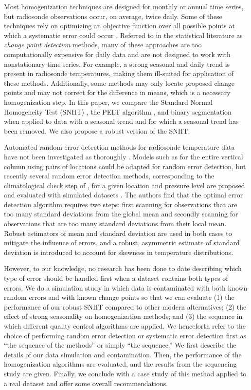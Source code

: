 \documentclass[12pt]{article}
\begin{document}
\begin{doublespacing}
Most homogenization techniques are designed for monthly or annual time series, but radiosonde observations occur, on average, twice daily.  Some of these techniques rely on optimizing an objective function over all possible points at which a systematic error could occur  \cite{killick12, li14, lu10, scott74}.  Referred to in the statistical literature as \emph{change point detection} methods,   many of these approaches are too computationally expensive for daily data and are not designed to work with nonstationary time series.  For example, a strong seasonal and daily trend is present in radiosonde temperatures, making them ill-suited for application of these methods.  Additionally, some methods may only locate proposed change points and may not correct for the difference in means, which is a necessary homogenization step.  In this paper, we compare the Standard Normal Homogeneity Test (SNHT) \cite{alexandersson86}, the PELT algorithm \cite{killick12}, and binary segmentation \cite{scott74} when applied to data with a seasonal trend and for which a seasonal trend has been removed.  We also propose a robust version of the SNHT.

Automated random error detection methods for radiosonde temperature data have not been investigated as thoroughly \cite{durre06,durre08,lanzante96}.  Models such as \cite{ignaccolo14} for  the entire vertical column using pairs of locations could be adapted for random error detection, but  recently  several random error detection methods, corresponding to the climatological check step of \cite{durre08}, for a given location and pressure level are proposed and evaluated with simulated datasets \cite{bell14}. The authors find that the optimal error detection algorithm requires two steps: first scanning for observations that are too many standard deviations from the global mean and secondly scanning for observations that are too many standard deviations from their local mean.  Robust estimators of mean and standard deviation are used in both cases to mitigate the influence of errors, and a robust, asymmetric estimate of standard deviation is introduced to account for skewness in temperature distributions.

However, to our knowledge, no research has been done to date describing which type of error should be handled first when a dataset contains both types of errors.  We do a simulation study in which data is contaminated with both known random errors and with known change points so that we can  evaluate  (1) the performance of our robust SNHT compared to other modern alternatives; (2) the effect of strong seasonality on homogenization methods; and (3) the sequence in which different quality control algorithms are applied.  We henceforth refer to the choice of performing random error detection or systematic error detection first  as ``the sequence of the methods'' or simply ``the sequence.''  We first describe the details of our data simulation and contamination.  Then, the performance of the homogenization algorithms are evaluated, and the results from the sequencing study are given.  Finally, we conclude with a case study of this method applied to a real dataset and offer some overall recommendations.  


\end{doublespacing}
\end{document}
